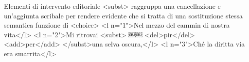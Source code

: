 Elementi di intervento editoriale
<subst> raggruppa una cancellazione e un’aggiunta scribale per rendere evidente che si tratta di una sostituzione
stessa semantica funzione di <choice>
<l n="1">Nel mezzo del cammin di nostra vita</l> <l n="2">Mi ritrovai <subst>
￼￼  <del>pir</del>
<add>per</add>
</subst>una selva oscura,</l>
<l n="3">Ché la diritta via era smarrita</l>